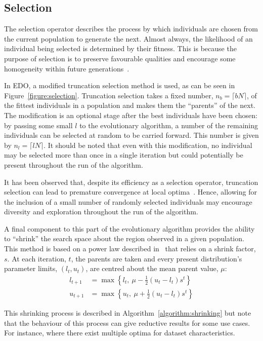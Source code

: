 \subsection{Selection}

The selection operator describes the process by which individuals are chosen
from the current population to generate the next. Almost always, the likelihood
of an individual being selected is determined by their fitness. This is because
the purpose of selection is to preserve favourable qualities and encourage some
homogeneity within future generations~\cite{Back1994}.



In EDO, a modified truncation selection method is used, as can be seen in
Figure~\ref{figure:selection}. Truncation selection takes a fixed number, \(n_b
= \lceil bN\rceil\), of the fittest individuals in a population and makes them
the ``parents'' of the next. The modification is an optional stage after the
best individuals have been chosen: by passing some small \(l\) to the
evolutionary algorithm, a number of the remaining individuals can be selected at
random to be carried forward. This number is given by \(n_l = \lceil lN
\rceil\). It should be noted that even with this modification, no individual may
be selected more than once in a single iteration but could potentially be
present throughout the run of the algorithm.

It has been observed that, despite its efficiency as a selection operator,
truncation selection can lead to premature convergence at local
optima~\cite{Jebari2013, Tatsuya2002}. Hence, allowing for the inclusion of a
small number of randomly selected individuals may encourage diversity and
exploration throughout the run of the algorithm.

A final component to this part of the evolutionary algorithm provides the
ability to ``shrink'' the search space about the region observed in a given
population. This method is based on a power law described
in~\cite{Amirjanov2016} that relies on a shrink factor, \(s\). At each
iteration, \(t\), the parents are taken and every present distribution's
parameter limits, \(\left(l_t, u_t\right)\), are centred about the mean parent
value, \(\mu\):
\begin{align}
    \label{eq:shrinking_lower}
    l_{t+1}&= \max \left\{l_t, \ \mu - \frac{1}{2} (u_t - l_t) s^t\right\}\\
    \label{eq:shrinking_upper}
    u_{t+1}&= \max \left\{u_t, \ \mu + \frac{1}{2} (u_t - l_t) s^t\right\}
\end{align}

This shrinking process is described in Algorithm~\ref{algorithm:shrinking} but
note that the behaviour of this process can give reductive results for some use
cases. For instance, where there exist multiple optima for dataset
characteristics.


